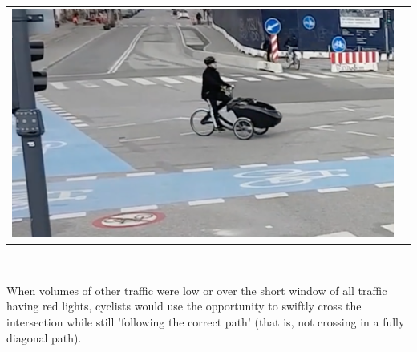 \raggedbottom
\begin{tabular}{@{}cc}
\includegraphics[width=1.0\columnwidth]{shorten_traj} 
\end{tabular}
\label{Alert2}
\

When volumes of other traffic were low or over the short window of all traffic having red lights, cyclists would use the opportunity 
to swiftly cross the intersection while still 'following the correct path' (that is, not crossing in a fully diagonal path). 


